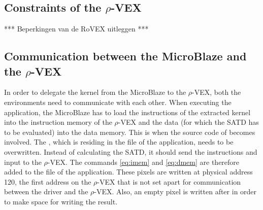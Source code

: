 \subsection{Constraints of the $\rho$-VEX}
***  Beperkingen van de RoVEX uitleggen ***

\subsection{Communication between the MicroBlaze and the $\rho$-VEX}

In order to delegate the  kernel from the MicroBlaze to the $\rho$-VEX, both the environments need to communicate with each other. When executing the  application, the MicroBlaze has to load the instructions of the extracted kernel into the instruction memory of the $\rho$-VEX and the data (for which the SATD has to be evaluated) into the data memory. This is when the source code of  becomes involved. The , which is residing in the  file of the application, needs to be overwritten. Instead of calculating the SATD, it should send the instructions and input to the $\rho$-VEX. The commands \ref{eq:imem} and \ref{eq:dmem} are therefore added to the  file of the  application. These pixels are written at physical address 120, the first address on the $\rho$-VEX that is not set apart for communication between the driver and the $\rho$-VEX. Also, an empty pixel is written after  in order to make space for writing the result. 


